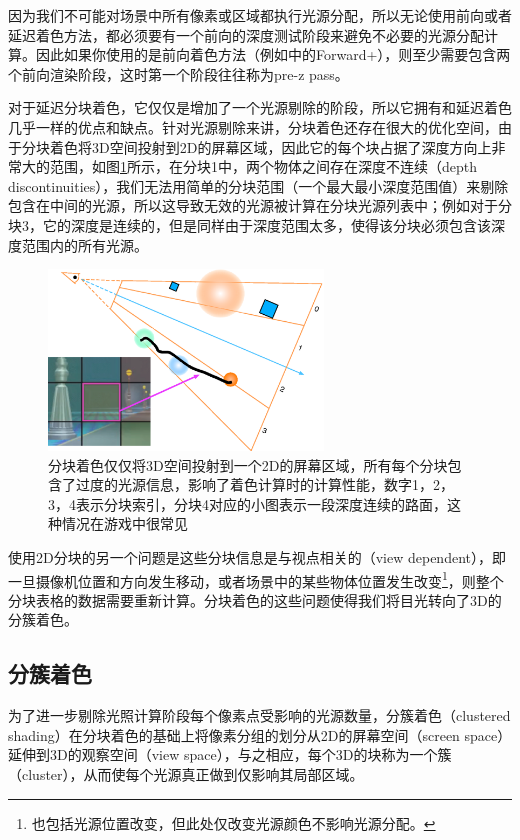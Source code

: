 因为我们不可能对场景中所有像素或区域都执行光源分配，所以无论使用前向或者延迟着色方法，都必须要有一个前向的深度测试阶段来避免不必要的光源分配计算。因此如果你使用的是前向着色方法（例如\cite{a:ForwardBringingDeferredLightingtotheNextLevel}中的Forward+），则至少需要包含两个前向渲染阶段，这时第一个阶段往往称为pre-z pass。

对于延迟分块着色，它仅仅是增加了一个光源剔除的阶段，所以它拥有和延迟着色几乎一样的优点和缺点。针对光源剔除来讲，分块着色还存在很大的优化空间，由于分块着色将3D空间投射到2D的屏幕区域，因此它的每个块占据了深度方向上非常大的范围，如图\ref{f:shade-tiled-problem}所示，在分块1中，两个物体之间存在深度不连续（depth discontinuities），我们无法用简单的分块范围（一个最大最小深度范围值）来剔除包含在中间的光源，所以这导致无效的光源被计算在分块光源列表中；例如对于分块3，它的深度是连续的，但是同样由于深度范围太多，使得该分块必须包含该深度范围内的所有光源。

\begin{figure}
	\sidecaption
	\includegraphics[width=0.65\textwidth]{figures/shade/tiled-problem}
	\caption{分块着色仅仅将3D空间投射到一个2D的屏幕区域，所有每个分块包含了过度的光源信息，影响了着色计算时的计算性能，数字1，2，3，4表示分块索引，分块4对应的小图表示一段深度连续的路面，这种情况在游戏中很常见}
	\label{f:shade-tiled-problem}
\end{figure}

使用2D分块的另一个问题是这些分块信息是与视点相关的（view dependent），即一旦摄像机位置和方向发生移动，或者场景中的某些物体位置发生改变\footnote{也包括光源位置改变，但此处仅改变光源颜色不影响光源分配。}，则整个分块表格的数据需要重新计算。分块着色的这些问题使得我们将目光转向了3D的分簇着色。





\subsection{分簇着色}\label{sec:shade-clustered-shading}
为了进一步剔除光照计算阶段每个像素点受影响的光源数量，分簇着色\cite{a:ClusteredDeferredandForwardShading}（clustered shading）在分块着色的基础上将像素分组的划分从2D的屏幕空间（screen space）延伸到3D的观察空间（view space），与之相应，每个3D的块称为一个簇（cluster），从而使每个光源真正做到仅影响其局部区域。

